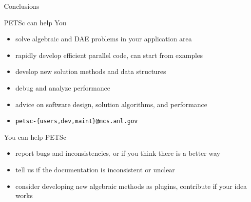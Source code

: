 














%
%

\begin{frame}{Conclusions}
 
 \begin{block}{PETSc can help You}
  \begin{itemize}
   \item solve algebraic and DAE problems in your application area
   \item rapidly develop efficient parallel code, can start from examples
   \item develop new solution methods and data structures
   \item debug and analyze performance
   \item advice on software design, solution algorithms, and performance
   \item \centering \texttt{petsc-\{users,dev,maint\}@mcs.anl.gov}

  \end{itemize}
 \end{block}

 \begin{block}{You can help PETSc}
  \begin{itemize}
   \item report bugs and inconsistencies, or if you think there is a better way
   \item tell us if the documentation is inconsistent or unclear
   \item consider developing new algebraic methods as plugins, contribute if your idea works
  \end{itemize}
 \end{block}

\end{frame}
